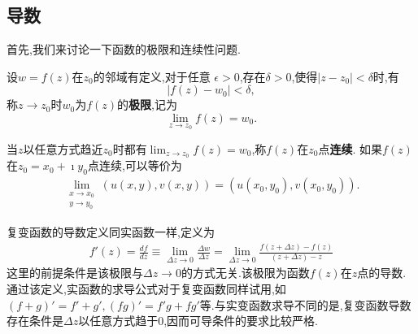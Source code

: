 \subsection{导数}

首先,我们来讨论一下函数的极限和连续性问题.
\begin{Definition}
    设$w=f(z)$在$z_0$的邻域有定义,对于任意
$\epsilon > 0$,存在$\delta > 0$,使得$|z-z_0| < \delta$时,有
\begin{equation}
    |f(z) - w_0| < \delta ,
\end{equation}
称$z\to z_0$时$w_0$为$f(z)$的{\bf 极限},记为
\begin{equation}
    \lim_{z\to z_0} f(z) = w_0 .
\end{equation}
\end{Definition}
当$z$以任意方式趋近$z_0$时都有$ \lim_{z\to z_0} f(z) = w_0$,称$f(z)$在$z_0$点{\bf 连续}.
如果$f(z)$ 在$z_0=x_0 + \imath y_0$点连续,可以等价为
\begin{align}
    \lim_{\substack{x\to x_0\\y\to y_0}} \left(u(x,y), v(x,y)\right) = \left(u(x_0, y_0), v(x_0, y_0)\right) . 
\end{align}

复变函数的导数定义同实函数一样,定义为
\begin{align}
    \label{eq:derivative_def}
    f'(z) = \frac{df}{dz} 
    \equiv\lim_{\Delta z \to 0} \frac{\Delta w} {\Delta z} 
    = \lim_{\Delta z\to 0} \frac{f(z+\Delta z) - f(z) } {(z+\Delta z ) - z}
\end{align}
这里的前提条件是该极限与$\Delta z \to 0$的方式无关.该极限为函数$f(z)$在$z$点的导数.通过该定义,实函数的求导公式对于复变函数同样试用,如
$(f+g)' = f' + g', (fg)' =f'g + fg'$等.与实变函数求导不同的是,复变函数导数存在条件是$\Delta z$以任意方式趋于$0$,因而可导条件的要求比较严格.


